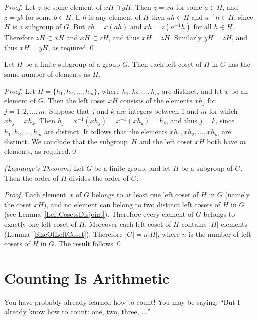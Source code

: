 \begin{proof}
Let $z$ be some element of $xH \cap yH$.  Then $z = xa$
for some $a \in H$, and $z = yb$ for some $b \in H$.
If $h$ is any element of $H$ then $ah \in H$ and
$a^{-1}h \in H$, since $H$ is a subgroup of $G$.
But $zh = x(ah)$ and $xh = z(a^{-1}h)$ for all $h \in H$.
Therefore $zH \subset xH$ and $xH \subset zH$, and thus
$xH = zH$.  Similarly $yH = zH$, and thus $xH = yH$,
as required.\qed
\end{proof}

\begin{lemma}
\label{SizeOfLeftCoset}
Let $H$ be a finite subgroup of a group $G$.  Then each left
coset of $H$ in $G$ has the same number of elements as $H$.
\end{lemma}

\begin{proof}
Let $H = \{ h_1, h_2,\ldots, h_m\}$, where
$h_1, h_2,\ldots, h_m$ are distinct, and let $x$ be an
element of $G$.  Then the left coset $xH$ consists of
the elements $x h_j$ for $j = 1,2,\ldots,m$.
Suppose that $j$ and $k$ are integers between
$1$ and $m$ for which $x h_j = x h_k$.  Then
$h_j = x^{-1} (x h_j) = x^{-1} (x h_k) = h_k$,
and thus $j = k$, since $h_1, h_2,\ldots, h_m$
are distinct.  It follows that the elements
$x h_1, x h_2,\ldots, x h_m$ are distinct.
We conclude that the subgroup~$H$ and the left
coset $xH$ both have $m$ elements,
as required.\qed
\end{proof}

\begin{theorem}
\emph{(Lagrange's Theorem)}
\label{Lagrange}
Let $G$ be a finite group, and let $H$ be a subgroup
of $G$.  Then the order of $H$ divides the order of $G$.
\end{theorem}

\begin{proof}
Each element~$x$ of $G$ belongs to at least one left coset
of $H$ in $G$ (namely the coset $xH$), and no element
can belong to two distinct left cosets of $H$ in $G$
(see Lemma~\ref{LeftCosetsDisjoint}).  Therefore every
element of $G$ belongs to exactly one left coset of $H$.
Moreover each left coset of $H$ contains $|H|$ elements
(Lemma~\ref{SizeOfLeftCoset}).  Therefore $|G| = n |H|$,
where $n$ is the number of left cosets of $H$ in $G$.
The result follows.\qed
\end{proof}







\section{Counting Is Arithmetic}
You have probably already learned  how to count! You may be saying: “But I already know how to count: one, two, three, $\ldots$”

